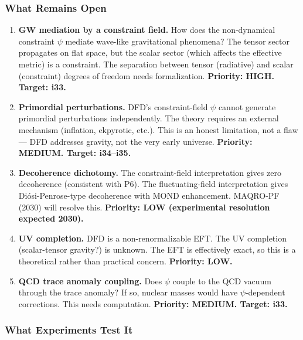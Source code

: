 \documentclass[11pt,a4paper]{article}
\begin{document}
\subsubsection{What Remains Open}

\begin{enumerate}
\item \textbf{GW mediation by a constraint field.} How does the non-dynamical constraint $\psi$ mediate wave-like gravitational phenomena? The tensor sector propagates on flat space, but the scalar sector (which affects the effective metric) is a constraint. The separation between tensor (radiative) and scalar (constraint) degrees of freedom needs formalization. \textbf{Priority: HIGH. Target: i33.}

\item \textbf{Primordial perturbations.} DFD's constraint-field $\psi$ cannot generate primordial perturbations independently. The theory requires an external mechanism (inflation, ekpyrotic, etc.). This is an honest limitation, not a flaw --- DFD addresses gravity, not the very early universe. \textbf{Priority: MEDIUM. Target: i34--i35.}

\item \textbf{Decoherence dichotomy.} The constraint-field interpretation gives zero decoherence (consistent with P6). The fluctuating-field interpretation gives Di\'{o}si-Penrose-type decoherence with MOND enhancement. MAQRO-PF (2030) will resolve this. \textbf{Priority: LOW (experimental resolution expected 2030).}

\item \textbf{UV completion.} DFD is a non-renormalizable EFT. The UV completion (scalar-tensor gravity?) is unknown. The EFT is effectively exact, so this is a theoretical rather than practical concern. \textbf{Priority: LOW.}

\item \textbf{QCD trace anomaly coupling.} Does $\psi$ couple to the QCD vacuum through the trace anomaly? If so, nuclear masses would have $\psi$-dependent corrections. This needs computation. \textbf{Priority: MEDIUM. Target: i33.}
\end{enumerate}

\subsubsection{What Experiments Test It}
\end{document}
